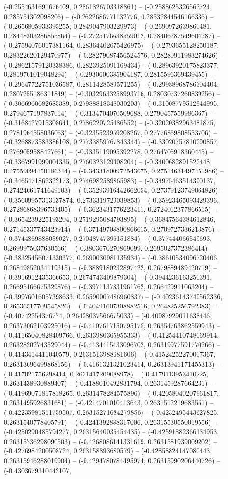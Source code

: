 (-0.2554631691676409, 0.2861826703318861) -- (-0.2588625326563724, 0.285754302098206) -- (-0.2622686771132776, 0.28532844546166336) -- (-0.2656805933395255, 0.2849047903229973) -- (-0.2690972639860481, 0.28448303286855864) -- (-0.2725176638559012, 0.28406287549604287) -- (-0.27594076017381164, 0.28364402675426975) -- (-0.2793655128250187, 0.28322620129470977) -- (-0.28279087456524576, 0.28280911983274626) -- (-0.28621579120338386, 0.2823925091169434) -- (-0.28963920175823377, 0.2819761019048294) -- (-0.2930600385904187, 0.2815596369439455) -- (-0.29647722751036587, 0.2811428589571255) -- (-0.29988968786304404, 0.2807255186311849) -- (-0.30329633258993716, 0.28030737260839256) -- (-0.3066960682685389, 0.27988818348030203) -- (-0.31008779512944995, 0.2794677197837014) -- (-0.3134704070509688, 0.2790457559986367) -- (-0.3168427915308641, 0.2786220725486552) -- (-0.32020382963481875, 0.2781964558036063) -- (-0.3235523959208267, 0.27776869808553706) -- (-0.3268873583386108, 0.27733859767843344) -- (-0.33020757810290857, 0.2769059588427661) -- (-0.3335119095392278, 0.2764705918360445) -- (-0.3367991999004335, 0.2760323129408204) -- (-0.3400682891522448, 0.27559094450186344) -- (-0.34331800972543675, 0.27514631497451986) -- (-0.3465471862322173, 0.2746982589865983) -- (-0.34975463514390137, 0.27424661741649103) -- (-0.35293916442662054, 0.27379123749064826) -- (-0.35609957313137874, 0.2733319729039853) -- (-0.35923465093429396, 0.27286868396733405) -- (-0.3623431776223411, 0.2724012377866515) -- (-0.3654239225193204, 0.2719295084793895) -- (-0.36847564384612846, 0.27145337743423914) -- (-0.37149708800866615, 0.2709727336213876) -- (-0.3744869888059027, 0.27048747396151884) -- (-0.377444066549693, 0.2699975037630566) -- (-0.3803670270869099, 0.2695027372386414) -- (-0.38325456071330377, 0.2690030981135934) -- (-0.38610534096720406, 0.26849852034119315) -- (-0.3889180232897422, 0.2679889489420719) -- (-0.3916912435366653, 0.2674743409879304) -- (-0.3944236163250391, 0.26695466675329876) -- (-0.3971137331961762, 0.266429911063204) -- (-0.39976016057398633, 0.26590007486960837) -- (-0.40236143749562336, 0.26536517709545826) -- (-0.40491607308882516, 0.264825256792383) -- (-0.40742254376774, 0.26428037566675033) -- (-0.40987929011638446, 0.26373062103925016) -- (-0.4107617150795178, 0.26354763862559943) -- (-0.41165040828409766, 0.2633980365955333) -- (-0.41254410748069914, 0.26328202743529044) -- (-0.4134415433096702, 0.26319977591770266) -- (-0.4143414411040579, 0.2631513988681606) -- (-0.41524252270007367, 0.26313696499868156) -- (-0.4161321321023414, 0.26313941171455313) -- (-0.417021756298414, 0.2631417209088978) -- (-0.4179113953410225, 0.2631438930889407) -- (-0.4188010492831794, 0.2631459287664231) -- (-0.41969071817818265, 0.2631478284575896) -- (-0.42058040207961817, 0.2631495926831681) -- (-0.4214701010413643, 0.2631512219683551) -- (-0.42235981511759507, 0.26315271684279856) -- (-0.4232495443627825, 0.2631540778405791) -- (-0.4241392888317006, 0.26315530550019556) -- (-0.4250290485794277, 0.26315640036454435) -- (-0.42591882366134953, 0.26315736298090503) -- (-0.4268086141331619, 0.2631581939009202) -- (-0.4276984200508724, 0.263158893680579) -- (-0.42858824147080443, 0.26315946288019904) -- (-0.4294780784495974, 0.26315990206440726) -- (-0.4303679310442107, 